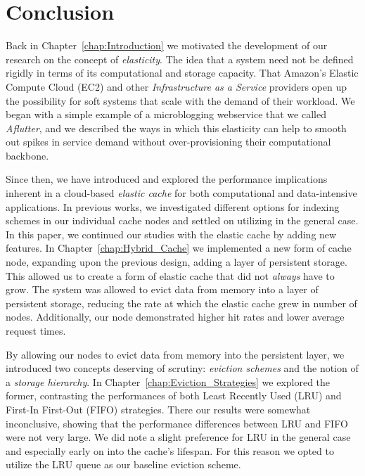 \section{Conclusion} %
\label{sec:conclusion}
Back in Chapter~\ref{chap:Introduction} we motivated the development of our
research on the concept of \emph{elasticity}. The idea that a system need not
be defined rigidly in terms of its computational and storage capacity.  That
Amazon's Elastic Compute Cloud (EC2) and other \emph{Infrastructure as a
Service} providers open up the possibility for soft systems that scale with the
demand of their workload. We began with a simple example of a microblogging
webservice that we called \emph{Aflutter}, and we described the ways in which
this elasticity can help to smooth out spikes in service demand without
over-provisioning their computational backbone.

Since then, we have introduced and explored the performance implications
inherent in a cloud-based \emph{elastic cache} for both computational and
data-intensive applications. In previous
works\cite{chiu_ijngc11,chiu_ccgrid11}, we investigated different options for
indexing schemes in our individual cache nodes and settled on utilizing
\bptrees in the general case. In this paper, we continued our studies with the
elastic cache by adding new features. In Chapter~\ref{chap:Hybrid_Cache} we
implemented a new form of cache node, expanding upon the previous design,
adding a layer of persistent storage. This allowed us to create a form of
elastic cache that did not \emph{always} have to grow. The system was allowed
to evict data from memory into a layer of persistent storage, reducing the rate
at which the elastic cache grew in number of nodes. Additionally, our node
demonstrated higher hit rates and lower average request times.

By allowing our nodes to evict data from memory into the persistent layer, we
introduced two concepts deserving of scrutiny: \emph{eviction schemes} and the
notion of a \emph{storage hierarchy}. In Chapter~\ref{chap:Eviction_Strategies}
we explored the former, contrasting the performances of both Least Recently
Used (LRU) and First-In First-Out (FIFO) strategies. There our results were
somewhat inconclusive, showing that the performance differences between LRU and
FIFO were not very large. We did note a slight preference for LRU in the
general case and especially early on into the cache's lifespan. For this reason
we opted to utilize the LRU queue as our baseline eviction scheme.

